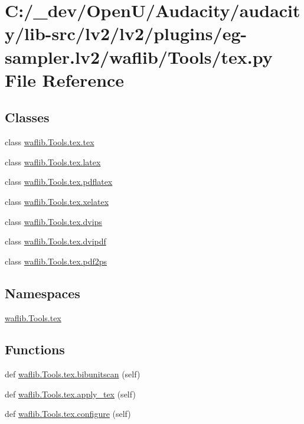 \hypertarget{lv2_2plugins_2eg-sampler_8lv2_2waflib_2_tools_2tex_8py}{}\section{C\+:/\+\_\+dev/\+Open\+U/\+Audacity/audacity/lib-\/src/lv2/lv2/plugins/eg-\/sampler.lv2/waflib/\+Tools/tex.py File Reference}
\label{lv2_2plugins_2eg-sampler_8lv2_2waflib_2_tools_2tex_8py}
\subsection*{Classes}
\begin{DoxyCompactItemize}
\item 
class \hyperlink{classwaflib_1_1_tools_1_1tex_1_1tex}{waflib.\+Tools.\+tex.\+tex}
\item 
class \hyperlink{classwaflib_1_1_tools_1_1tex_1_1latex}{waflib.\+Tools.\+tex.\+latex}
\item 
class \hyperlink{classwaflib_1_1_tools_1_1tex_1_1pdflatex}{waflib.\+Tools.\+tex.\+pdflatex}
\item 
class \hyperlink{classwaflib_1_1_tools_1_1tex_1_1xelatex}{waflib.\+Tools.\+tex.\+xelatex}
\item 
class \hyperlink{classwaflib_1_1_tools_1_1tex_1_1dvips}{waflib.\+Tools.\+tex.\+dvips}
\item 
class \hyperlink{classwaflib_1_1_tools_1_1tex_1_1dvipdf}{waflib.\+Tools.\+tex.\+dvipdf}
\item 
class \hyperlink{classwaflib_1_1_tools_1_1tex_1_1pdf2ps}{waflib.\+Tools.\+tex.\+pdf2ps}
\end{DoxyCompactItemize}
\subsection*{Namespaces}
\begin{DoxyCompactItemize}
\item 
 \hyperlink{namespacewaflib_1_1_tools_1_1tex}{waflib.\+Tools.\+tex}
\end{DoxyCompactItemize}
\subsection*{Functions}
\begin{DoxyCompactItemize}
\item 
def \hyperlink{namespacewaflib_1_1_tools_1_1tex_a0995543408e2b3f7705b148ffcce08b3}{waflib.\+Tools.\+tex.\+bibunitscan} (self)
\item 
def \hyperlink{namespacewaflib_1_1_tools_1_1tex_ac13f6c937ac7ea4af8d30e2a71f312f0}{waflib.\+Tools.\+tex.\+apply\+\_\+tex} (self)
\item 
def \hyperlink{namespacewaflib_1_1_tools_1_1tex_a63e6ed812ce192be695521518632025a}{waflib.\+Tools.\+tex.\+configure} (self)
\end{DoxyCompactItemize}
